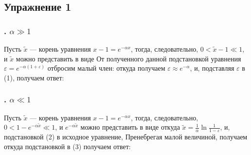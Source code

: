 \def \picdir{pic/}

\subsection*{Упражнение 1}
\subsubsection*{. $\alpha \gg 1$}
Пусть $\tilde{x}$ --- корень уравнения $x-1 = e^{-\alpha x}$, тогда,
следовательно, $0 < \tilde{x} - 1 \ll 1$, и $\tilde{x}$ можно представить в виде
От полученного данной подстановкой уравнения $\varepsilon = e^{-\alpha(1 + \varepsilon)}$ отбросим малый член:
откуда получаем $\varepsilon \approx e^{-\alpha}$, и, подставляя $\varepsilon$ в (1), получаем ответ:
\subsubsection*{. $\alpha \ll 1$}
Пусть $\tilde{x}$ --- корень уравнения $x-1 = e^{-\alpha x}$, тогда,
следовательно, $0 < 1 - e^{-\alpha \tilde{x}} \ll 1$, и $e^{-\alpha \tilde{x}}$ можно представить в виде
откуда $\tilde{x} = \frac{1}{\alpha}\ln{\frac{1}{1 - \varepsilon}}$, и, подстановкой (2) в исходное уравнение,
Пренебрегая малой величиной, получаем
откуда подстановкой в (3) получаем ответ:
